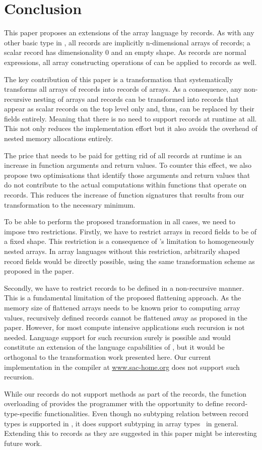 
\section{Conclusion}\label{sec:conclusion}

This paper proposes an extensions of the array language \sac{} by records.
As with any other basic type in \sac{}, all records are implicitly n-dimensional arrays of records; a scalar record has dimensionality 0 and an empty shape.
As records are normal expressions, all array constructing operations of \sac{} can be applied to records as well.

The key contribution of this paper is a transformation that systematically transforms 
all arrays of records into records of arrays.
As a consequence, any non-recursive nesting of arrays and records can be transformed into records that appear as scalar records on the top level only and, thus, can be replaced by their fields entirely.
Meaning that there is no need to support records at runtime at all.
This not only reduces the implementation effort but it also avoids the overhead of nested memory allocations entirely.

The price that needs to be paid for getting rid of all records at runtime is an increase in function arguments and return values.
To counter this effect, we also propose two optimisations that identify those arguments and return values that do not contribute to the actual computations within functions that operate on records.
This reduces the increase of function signatures that results from our transformation to the necessary minimum.

To be able to perform the proposed transformation in all cases, we need to impose two restrictions.
Firstly, we have to restrict arrays in record fields to be of a fixed shape.
This restriction is a consequence of \sac{}'s limitation to homogeneously nested arrays.
In array languages without this restriction, arbitrarily shaped record fields would be directly possible, using the same transformation scheme as proposed in the paper.

Secondly, we have to restrict records to be defined in a non-recursive manner.
This is a fundamental limitation of the proposed flattening approach.
As the memory size of flattened arrays needs to be known prior to computing array values, recursively defined records cannot be flattened away as proposed in the paper.
However, for most compute intensive applications such recursion is not needed.
Language support for such recursion surely is possible and would constitute an extension of the language capabilities of \sac{}, but it would be orthogonal to the transformation work presented here.
Our current implementation in the \sac{} compiler at \url{www.sac-home.org} does not support such recursion.

While our records do not support methods as part of the records, the function overloading of \sac{} provides the programmer with the opportunity to define record-type-specific functionalities.
Even though no subtyping relation between record types is supported in \sac{}, it does support subtyping in array types~\cite{homogeneousness} in general.
Extending this to records as they are suggested in this paper might be interesting future work.
